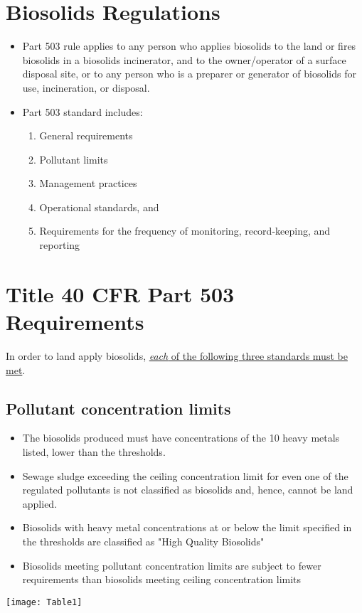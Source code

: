 \section{Biosolids Regulations}

			\begin{itemize}
				\item Part 503 rule applies to any person who applies biosolids to the land or fires biosolids in a biosolids incinerator, and to the owner/operator of a surface disposal site, or to any person who is a preparer or generator of biosolids for use, incineration, or disposal.
				\item Part 503 standard includes:
					\begin{enumerate}
						\item General requirements
						\item Pollutant limits
						\item Management practices
						\item Operational standards, and
						\item Requirements for the frequency of monitoring, record-keeping, and reporting
					\end{enumerate}
			\end{itemize}



\section{Title 40 CFR Part 503 Requirements}

In order to land apply biosolids, \underline{\emph{each} of the following three standards must be met}.

\subsection{Pollutant concentration limits}


			\begin{itemize}
				\item The biosolids produced must have concentrations of the 10 heavy metals listed, lower than the  thresholds.
				\item Sewage sludge exceeding the ceiling concentration limit for even one of the regulated pollutants is not classified as biosolids and, hence, cannot be land applied.
				\item Biosolids with heavy metal concentrations at or below the limit specified in the  thresholds are classified as "High Quality Biosolids"
				\item Biosolids meeting pollutant concentration limits are subject to fewer requirements than biosolids meeting ceiling concentration limits
			\end{itemize}
			\vspace{0.5cm}
			\begin{center}
			\texttt{[image: Table1]}
			\end{center}

